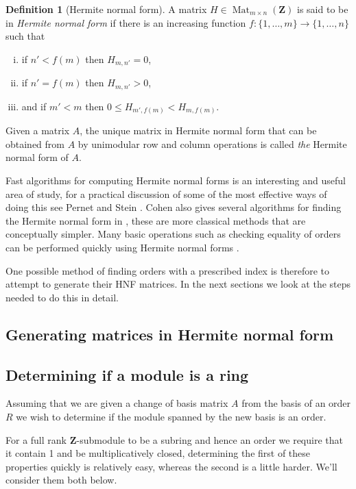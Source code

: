 \documentclass[12pt,a4paper,abstracton,bibtotoc]{scrreprt}
\theoremstyle{definition}
\newtheorem{defn}{Definition}
\newcommand{\ZZ}{\mathbf{Z}}
\DeclareMathOperator{\Mat}{Mat}
\begin{document}
\begin{defn}[Hermite normal form] %
A matrix $H\in\Mat_{m\times n}(\ZZ)$ is said to be in \emph{Hermite normal form} if there is an increasing function $f\colon \{1, \ldots, m\} \to \{1,\ldots , n\}$ such that
\begin{enumerate}[i)]
\item if $n' < f(m)$ then $H_{m,n'} = 0$,
\item if $n' = f(m)$ then $H_{m,n'} > 0$,
\item and if $m' < m$ then $0\le H_{m',f(m)} < H_{m,f(m)}$.
\end{enumerate}

Given a matrix $A$, the unique matrix in Hermite normal form that can be obtained from $A$ by unimodular row and column operations is called \emph{the} Hermite normal form of $A$.
\end{defn}

Fast algorithms for computing Hermite normal forms is an interesting and useful area of study, for a practical discussion of some of the most effective ways of doing this see Pernet and Stein \cite{pernetstein}.
Cohen also gives several algorithms for finding the Hermite normal form in \cite{cohen93}, these are more classical methods that are conceptually simpler.
Many basic operations such as checking equality of orders can be performed quickly using Hermite normal forms \cite{cohen93}.  %

One possible method of finding orders with a prescribed index is therefore to attempt to generate their HNF matrices.
In the next sections we look at the steps needed to do this in detail.

\subsection{Generating matrices in Hermite normal form}


\subsection{Determining if a module is a ring}
Assuming that we are given a change of basis matrix $A$ from the basis of an order $R$ we wish to determine if the module spanned by the new basis is an order.

For a full rank $\ZZ$-submodule to be a subring and hence an order we require that it contain 1 and be multiplicatively closed, determining the first of these properties quickly is relatively easy, whereas the second is a little harder.
We'll consider them both below.
\end{document}
